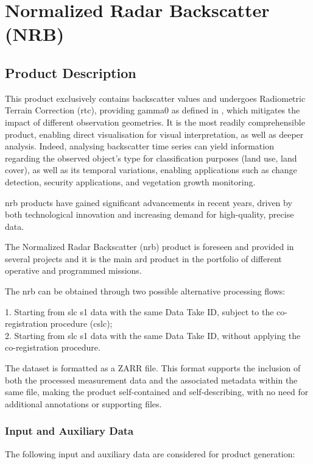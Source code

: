 \section{Normalized Radar Backscatter (NRB)}
\label{s:nrb}

\subsection{Product Description}
\label{sec:nrb_prod_description}

This product exclusively contains backscatter values and undergoes Radiometric Terrain Correction (\acs{rtc}), providing \gls{gamma0} as defined in \cite{Small2011}, which mitigates the impact of different observation geometries. It is the most readily comprehensible product, enabling direct visualisation for visual interpretation, as well as deeper analysis. Indeed, analysing backscatter time series can yield information regarding the observed object's type for classification purposes (land use, land cover), as well as its temporal variations, enabling applications such as change detection, security applications, and vegetation growth monitoring.

\acs{nrb} products have gained significant advancements in recent years, driven by both technological innovation and increasing demand for high-quality, precise data.

The Normalized Radar Backscatter (\acs{nrb}) product is foreseen and provided in several projects and it is the main \acs{ard} product in the portfolio of different operative and programmed missions.

The \acs{nrb} can be obtained through two possible alternative processing flows:
   
   1. Starting from \acs{slc} \acs{s1} data with the same Data Take ID, subject to the co-registration procedure (\acs{cslc}); \\
   2. Starting from \acs{slc} \acs{s1} data with the same Data Take ID, without applying the co-registration procedure.

The dataset is formatted as a ZARR file. This format supports the inclusion of both the processed measurement data and the associated metadata within the same file, making the product self-contained and self-describing, with no need for additional annotations or supporting files.

\subsubsection{Input and Auxiliary Data}
The following input and auxiliary data are considered for product generation:

